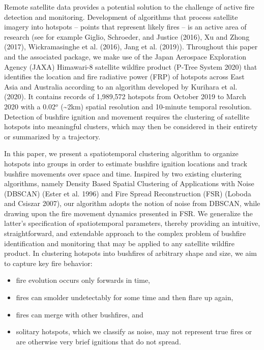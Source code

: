 Remote satellite data provides a potential solution to the challenge of active fire detection and monitoring. Development of algorithms that process satellite imagery into hotspots -- points that represent likely fires -- is an active area of research (see for example Giglio, Schroeder, and Justice (2016), Xu and Zhong (2017), Wickramasinghe et al. (2016), Jang et al. (2019)). Throughout this paper and the associated package, we make use of the Japan Aerospace Exploration Agency (JAXA) Himawari-8 satellite wildfire product (P-Tree System 2020) that identifies the location and fire radiative power (FRP) of hotspots across East Asia and Australia according to an algorithm developed by Kurihara et al. (2020). It contains records of 1,989,572 hotspots from October 2019 to March 2020 with a 0.02\(^o\) (\textasciitilde2km) spatial resolution and 10-minute temporal resolution. Detection of bushfire ignition and movement requires the clustering of satellite hotspots into meaningful clusters, which may then be considered in their entirety or summarized by a trajectory.

In this paper, we present a spatiotemporal clustering algorithm to organize hotspots into groups in order to estimate bushfire ignition locations and track bushfire movements over space and time. Inspired by two existing clustering algorithms, namely Density Based Spatial Clustering of Applications with Noise (DBSCAN) (Ester et al. 1996) and Fire Spread Reconstruction (FSR) (Loboda and Csiszar 2007), our algorithm adopts the notion of noise from DBSCAN, while drawing upon the fire movement dynamics presented in FSR. We generalize the latter's specification of spatiotemporal parameters, thereby providing an intuitive, straightforward, and extendable approach to the complex problem of bushfire identification and monitoring that may be applied to any satellite wildfire product. In clustering hotspots into bushfires of arbitrary shape and size, we aim to capture key fire behavior:

\begin{itemize}
\tightlist
\item
  fire evolution occurs only forwards in time,
\item
  fires can smolder undetectably for some time and then flare up again,
\item
  fires can merge with other bushfires, and
\item
  solitary hotspots, which we classify as noise, may not represent true fires or are otherwise very brief ignitions that do not spread.
\end{itemize}

